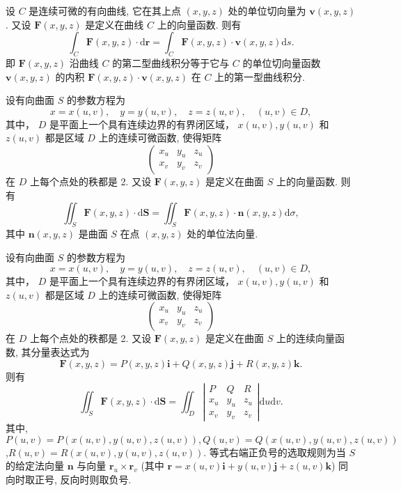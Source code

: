 \begin{theorem}[第二型曲线积分与第一型曲线积分的关系]
    设 $C$ 是连续可微的有向曲线, 它在其上点 $(x, y, z)$ 处的单位切向量为 $\boldsymbol{v}(x, y, z)$. 又设 $\boldsymbol{F}(x, y, z)$ 是定义在曲线 $C$ 上的向量函数. 则有
    $$
    \int_C \boldsymbol{F}(x, y, z) \cdot \mathrm{d} \boldsymbol{r}=\int_C \boldsymbol{F}(x, y, z) \cdot \boldsymbol{v}(x, y, z) \mathrm{d} s .
    $$
    即 $\boldsymbol{F}(x, y, z)$ 沿曲线 $C$ 的第二型曲线积分等于它与 $C$ 的单位切向量函数 $\boldsymbol{v}(x, y, z)$ 的内积 $\boldsymbol{F}(x, y, z) \cdot \boldsymbol{v}(x, y, z)$ 在 $C$ 上的第一型曲线积分.
\end{theorem}

\begin{theorem}[第二型曲面积分与第一型曲面积分的关系]
    设有向曲面 $S$ 的参数方程为
    $$
    x=x(u, v), \quad y=y(u, v), \quad z=z(u, v), \quad(u, v) \in D,
    $$
    其中， $D$ 是平面上一个具有连续边界的有界闭区域， $x(u, v), y(u, v)$ 和 $z(u, v)$ 都是区域 $D$ 上的连续可微函数, 使得矩阵
    $$
    \left(\begin{array}{lll}
    x_u & y_u & z_u \\
    x_v & y_v & z_v
    \end{array}\right)
    $$
    在 $D$ 上每个点处的秩都是 2. 又设 $\boldsymbol{F}(x,y,z)$ 是定义在曲面 $S$ 上的向量函数. 则有
    $$
    \iint_S \boldsymbol{F}(x,y,z) \cdot \mathrm{d}\boldsymbol{S} = \iint_S \boldsymbol{F}(x,y,z) \cdot \boldsymbol{n}(x,y,z) \mathrm{d}\sigma,
    $$
    其中 $\boldsymbol{n}(x,y,z)$ 是曲面 $S$ 在点 $(x,y,z)$ 处的单位法向量.
\end{theorem}

\begin{theorem}[第二型曲面积分正负号的确定]\label{第二型曲面积分正负号的确定}
    设有向曲面 $S$ 的参数方程为
    $$
    x=x(u, v), \quad y=y(u, v), \quad z=z(u, v), \quad(u, v) \in D,
    $$
    其中， $D$ 是平面上一个具有连续边界的有界闭区域， $x(u, v), y(u, v)$ 和 $z(u, v)$ 都是区域 $D$ 上的连续可微函数, 使得矩阵
    $$
    \left(\begin{array}{lll}
    x_u & y_u & z_u \\
    x_v & y_v & z_v
    \end{array}\right)
    $$
    在 $D$ 上每个点处的秩都是 2. 又设 $\boldsymbol{F}(x, y, z)$ 是定义在曲面 $S$ 上的连续向量函数, 其分量表达式为
    $$
    \boldsymbol{F}(x, y, z)=P(x, y, z) \boldsymbol{i}+Q(x, y, z) \boldsymbol{j}+R(x, y, z) \boldsymbol{k} .
    $$
    则有
    $$
    \iint_S \boldsymbol{F}(x,y,z) \cdot \mathrm{d}\boldsymbol{S} = \iint_D \left|\begin{array}{ccc}
    P & Q & R \\
    x_u & y_u & z_u \\
    x_v & y_v & z_v
    \end{array}\right| \mathrm{d}u\mathrm{d}v.
    $$
    其中, $P(u, v)=P(x(u, v), y(u, v), z(u, v)), Q(u, v)=Q(x(u, v), y(u, v), z(u, v))$,$ R(u, v)=R(x(u, v), y(u, v), z(u, v))$. 等式右端正负号的选取规则为当 $S$ 的给定法向量 $\boldsymbol{n}$ 与向量 $\boldsymbol{r}_u \times \boldsymbol{r}_v$ (其中 $\boldsymbol{r}=x(u, v) \boldsymbol{i}+y(u, v) \boldsymbol{j}+z(u, v) \boldsymbol{k}$) 同向时取正号, 反向时则取负号.
\end{theorem}

